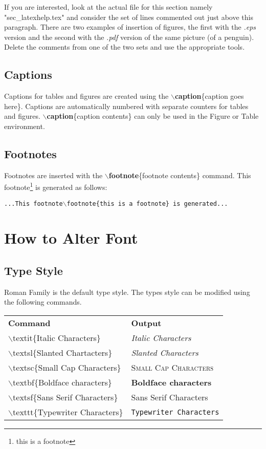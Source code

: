 If you are interested, look at the actual file for this section namely "sec\_latexhelp.tex"
and consider the set of lines commented out just above this paragraph. There are two examples of insertion of figures, the first with the
\textit{.eps} version and the second with the \textit{.pdf} version of the same picture (of a penguin). Delete the comments from one of the two sets and use the appropriate tools.

\subsection{Captions}
 Captions for tables and figures are created using the \textbf{$\backslash$caption}\{caption goes here\}. Captions are automatically numbered with separate counters for tables and figures. \textbf{$\backslash$caption}\{caption contents\} can only be used in the Figure or Table environment.

\subsection{Footnotes}
 Footnotes are inserted with the \textbf{$\backslash$footnote}\{footnote contents\} command.  This footnote\footnote{this is a footnote} is generated as follows:
 \begin{center}
    \texttt{...This footnote$\backslash$footnote\{this is a footnote\} is generated...}
 \end{center}

\section{How to Alter Font}
\subsection{Type Style}
 Roman Family is the default type style.  The types style can be modified using the following commands.
 \\\vspace{-2mm}
 \begin{center}
    \begin{tabular}{ll}
        \textbf{Command}                                & \textbf{Output} \\
        $\backslash$textit\{Italic Characters\}         & \textit{Italic Characters}\\
        $\backslash$textsl\{Slanted Chartacters\}       & \textsl{Slanted Characters}\\
        $\backslash$textsc\{Small Cap Characters\}      & \textsc{Small Cap Characters}\\
        $\backslash$textbf\{Boldface characters\}       & \textbf{Boldface characters}\\
        $\backslash$textsf\{Sans Serif Characters\}     & \textsf{Sans Serif Characters}\\
        $\backslash$texttt\{Typewriter Characters\}     & \texttt{Typewriter Characters}
    \end{tabular}
 \end{center}

